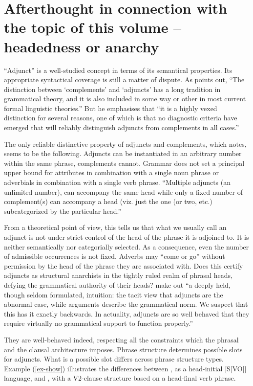 \documentclass[output=paper
  ,nobabel
  ,uniformtopskip %
]{langscibook}
\begin{document}
\section{Afterthought in connection with the topic of this volume – headedness or anarchy}

\largerpage
``Adjunct'' is a well-studied concept in terms of its semantical properties. Its appropriate syntactical coverage is still a matter of dispute. As \citet*[33]{Dowty2003a} points out, ``The distinction between `complements' and `adjuncts' has a long tradition in grammatical theory, and it is also included in some way or other in most current formal linguistic theories.'' But he emphasises that ``it is a highly vexed distinction for several reasons, one of which is that no diagnostic criteria have emerged that will reliably distinguish adjuncts from complements in all cases.''

The only reliable distinctive property of adjuncts and complements, which \citet{Dowty2003a} notes, seems to be the following. Adjuncts can be instantiated in an arbitrary number within the same phrase, complements cannot. Grammar does not set a principal upper bound for attributes in combination with a single noun phrase or adverbials in combination with a single verb phrase. ``Multiple adjuncts (an unlimited number), can accompany the same head while only a fixed number of complement(s) can accompany a head (viz. just the one (or two, etc.) subcategorized by the particular head.'' \citep[39]{Dowty2003a}

From a theoretical point of view, this tells us that what we usually call an adjunct is not under strict control of the head of the phrase it is adjoined to. It is neither semantically nor categorially selected. As a consequence, even the number of admissible occurrences is not fixed. Adverbs may ``come or go'' without permission by the head of the phrase they are associated with. Does this certify adjuncts as structural anarchists in the tightly ruled realm of phrasal heads, defying the grammatical authority of their heads? \citet*[58]{HornsteinNunes2008} make out ``a deeply held, though seldom formulated, intuition: the tacit view that adjuncts are the abnormal case, while arguments describe the grammatical norm. We suspect that this has it exactly backwards. In actuality, adjuncts are so well behaved that they require virtually no grammatical support to function properly.''

They are well-behaved indeed, respecting all the constraints which the phrasal and the clausal architecture imposes. Phrase structure determines possible slots for adjuncts. What is a possible slot differs across phrase structure types. Example (\ref{ex-show}) illustrates the differences between , as a head-initial [S[VO]] language, and , with a V2-clause structure based on a head-final verb phrase.
\end{document}
